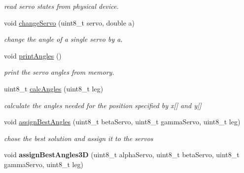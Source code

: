 \begin{DoxyCompactItemize}
\begin{DoxyCompactList}\small\item\em read servo states from physical device. \item\end{DoxyCompactList}\item 
\hypertarget{class_c_q_ped_a1164619231de4b603e81a9667dd70426}{
void \hyperlink{class_c_q_ped_a1164619231de4b603e81a9667dd70426}{changeServo} (uint8\_\-t servo, double a)}
\label{class_c_q_ped_a1164619231de4b603e81a9667dd70426}

\begin{DoxyCompactList}\small\item\em change the angle of a single servo by a. \item\end{DoxyCompactList}\item 
\hypertarget{class_c_q_ped_a5692f3e1bd4f098dd56dcf2501bebca2}{
void \hyperlink{class_c_q_ped_a5692f3e1bd4f098dd56dcf2501bebca2}{printAngles} ()}
\label{class_c_q_ped_a5692f3e1bd4f098dd56dcf2501bebca2}

\begin{DoxyCompactList}\small\item\em print the servo angles from memory. \item\end{DoxyCompactList}\item 
\hypertarget{class_c_q_ped_a25df4f0ebb62de1ec8ec07cc3650176e}{
uint8\_\-t \hyperlink{class_c_q_ped_a25df4f0ebb62de1ec8ec07cc3650176e}{calcAngles} (uint8\_\-t leg)}
\label{class_c_q_ped_a25df4f0ebb62de1ec8ec07cc3650176e}

\begin{DoxyCompactList}\small\item\em calculate the angles needed for the position specified by x\mbox{[}\mbox{]} and y\mbox{[}\mbox{]} \item\end{DoxyCompactList}\item 
\hypertarget{class_c_q_ped_a59ff39aab4b6e694c756799106d5bf45}{
void \hyperlink{class_c_q_ped_a59ff39aab4b6e694c756799106d5bf45}{assignBestAngles} (uint8\_\-t betaServo, uint8\_\-t gammaServo, uint8\_\-t leg)}
\label{class_c_q_ped_a59ff39aab4b6e694c756799106d5bf45}

\begin{DoxyCompactList}\small\item\em chose the best solution and assign it to the servos \item\end{DoxyCompactList}\item 
\hypertarget{class_c_q_ped_ad2448f69b567bd2817b0c04abff90f32}{
void {\bfseries assignBestAngles3D} (uint8\_\-t alphaServo, uint8\_\-t betaServo, uint8\_\-t gammaServo, uint8\_\-t leg)}
\label{class_c_q_ped_ad2448f69b567bd2817b0c04abff90f32}

\end{DoxyCompactItemize}
